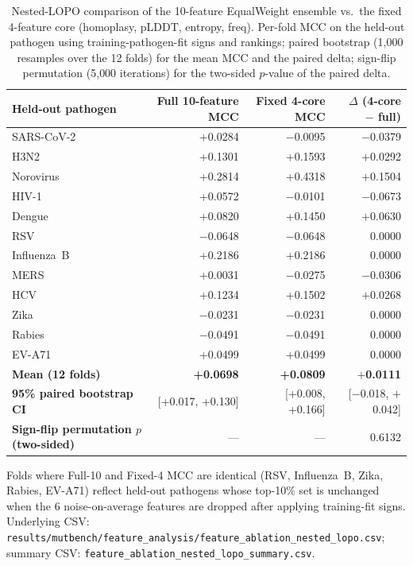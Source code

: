 \begin{table}[htbp]
\centering
\caption{Nested-LOPO comparison of the 10-feature EqualWeight ensemble vs.\ the fixed 4-feature core (homoplasy, pLDDT, entropy, freq). Per-fold MCC on the held-out pathogen using training-pathogen-fit signs and rankings; paired bootstrap (1{,}000 resamples over the 12 folds) for the mean MCC and the paired delta; sign-flip permutation (5{,}000 iterations) for the two-sided $p$-value of the paired delta.}
\label{tab:nested_lopo_4core}
\footnotesize
\begin{tabular}{lrrr}
\toprule
\textbf{Held-out pathogen} & \textbf{Full 10-feature MCC} & \textbf{Fixed 4-core MCC} & \textbf{$\Delta$ (4-core $-$ full)} \\
\midrule
SARS-CoV-2 &  +0.0284 & $-$0.0095 & $-$0.0379 \\
H3N2       &  +0.1301 &  +0.1593 & $+$0.0292 \\
Norovirus  &  +0.2814 &  +0.4318 & $+$0.1504 \\
HIV-1      &  +0.0572 & $-$0.0101 & $-$0.0673 \\
Dengue     &  +0.0820 &  +0.1450 & $+$0.0630 \\
RSV        & $-$0.0648 & $-$0.0648 &  $\phantom{+}$0.0000 \\
Influenza~B &  +0.2186 &  +0.2186 &  $\phantom{+}$0.0000 \\
MERS       &  +0.0031 & $-$0.0275 & $-$0.0306 \\
HCV        &  +0.1234 &  +0.1502 & $+$0.0268 \\
Zika       & $-$0.0231 & $-$0.0231 &  $\phantom{+}$0.0000 \\
Rabies     & $-$0.0491 & $-$0.0491 &  $\phantom{+}$0.0000 \\
EV-A71     &  +0.0499 &  +0.0499 &  $\phantom{+}$0.0000 \\
\midrule
\textbf{Mean (12 folds)} & \textbf{+0.0698} & \textbf{+0.0809} & \textbf{$+$0.0111} \\
\textbf{95\% paired bootstrap CI} & [+0.017, +0.130] & [+0.008, +0.166] & [$-$0.018, $+$0.042] \\
\textbf{Sign-flip permutation $p$ (two-sided)} & --- & --- & 0.6132 \\
\bottomrule
\end{tabular}
\begin{minipage}{\textwidth}
\smallskip
\footnotesize Folds where Full-10 and Fixed-4 MCC are identical (RSV, Influenza~B, Zika, Rabies, EV-A71) reflect held-out pathogens whose top-10\% set is unchanged when the 6 noise-on-average features are dropped after applying training-fit signs. Underlying CSV: \texttt{results/mutbench/feature\_analysis/feature\_ablation\_nested\_lopo.csv}; summary CSV: \texttt{feature\_ablation\_nested\_lopo\_summary.csv}.
\end{minipage}
\end{table}

